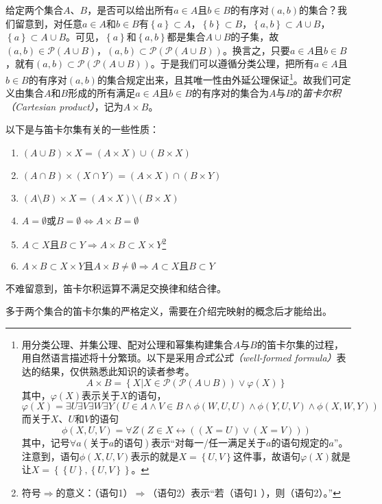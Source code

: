 \documentclass[../main.tex]{subfiles}
\begin{document}
给定两个集合$A$、$B$，是否可以给出所有$a\in A$且$b\in B$的有序对$\left(a,b\right)$的集合？我们留意到，对任意$a\in A$和$b\in B$有$\left\{a\right\}\subset A$，$\left\{b\right\}\subset B$，$\left\{a,b\right\}\subset A\cup B$，$\left\{a\right\}\subset A\cup B$。可见，$\left\{a\right\}$和$\left\{a,b\right\}$都是集合$A\cup B$的子集，故$\left(a,b\right)\in\mathcal{P}\left(A\cup B\right)$，$\left(a,b\right)\subset\mathcal{P}\left(\mathcal{P}\left(A\cup B\right)\right)$。换言之，只要$a\in A$且$b\in B$，就有$\left(a,b\right)\subset\mathcal{P}\left(\mathcal{P}\left(A\cup B\right)\right)$。于是我们可以遵循分类公理，把所有$a\in A$且$b\in B$的有序对$\left(a,b\right)$的集合规定出来，且其唯一性由外延公理保证\footnote{
    用分类公理、并集公理、配对公理和幂集构建集合$A$与$B$的笛卡尔集的过程，用自然语言描述将十分繁琐。以下是采用\emph{合式公式（well-formed formula）}表达的结果，仅供熟悉此知识的读者参考。
    \[A\times B=\left\{X|X\in\mathcal{P}\left(\mathcal{P}\left(A\cup B\right)\right)\vee\varphi\left(X\right)\right\}
    \]
    其中，$\varphi\left(X\right)$表示关于$X$的语句，
    \[
        \varphi\left(X\right)=\exists U\exists V\exists W \exists Y\left(U\in A \wedge V\in B\wedge \phi\left(W,U,U\right)\wedge\phi\left(Y,U,V\right)\wedge\phi\left(X,W,Y\right)\right)
    \]
    而关于$X$、$U$和$V$的语句
    \[
        \phi\left(X,U,V\right)=\forall Z\left(Z\in X\leftrightarrow\left(\left(X=U\right)\vee\left(X=V\right)\right)\right)
    \]
    其中，记号$\forall a\left(\text{关于$a$的语句}\right)$表示“对每一/任一满足关于$a$的语句规定的$a$”。注意到，语句$\phi\left(X,U,V\right)$表示的就是$X=\left\{U,V\right\}$这件事，故语句$\varphi\left(X\right)$就是让$X=\left\{\left\{U\right\},\left\{U,V\right\}\right\}$。
}。故我们可定义由集合$A$和$B$形成的所有满足$a\in A$且$b\in B$的有序对的集合为$A$与$B$的\emph{笛卡尔积（Cartesian product）}，记为$A\times B$。

以下是与笛卡尔集有关的一些性质：
\begin{enumerate}
    \item $\left(A\cup B\right)\times X=\left(A\times X\right)\cup\left(B\times X\right)$
    \item $\left(A\cap B\right)\times \left(X\cap Y\right)=\left(A\times X\right)\cap\left(B\times Y\right)$
    \item $\left(A\setminus B\right)\times X=\left(A\times X\right)\setminus \left(B\times X\right)$
    \item $A=\emptyset\text{或}B=\emptyset\Leftrightarrow A\times B=\emptyset$
    \item $A\subset X\text{且}B\subset Y\Rightarrow A\times B\subset X\times Y$\footnote{符号$\Rightarrow$的意义：（语句1）$\Rightarrow$（语句2）表示“若（语句1 ），则（语句2）。”}
    \item $A\times B\subset X\times Y\text{且}A\times B\neq\emptyset\Rightarrow A\subset X\text{且}B\subset Y$
\end{enumerate}

不难留意到，笛卡尔积运算不满足交换律和结合律。

多于两个集合的笛卡尔集的严格定义，需要在介绍完映射的概念后才能给出。

\end{document}
